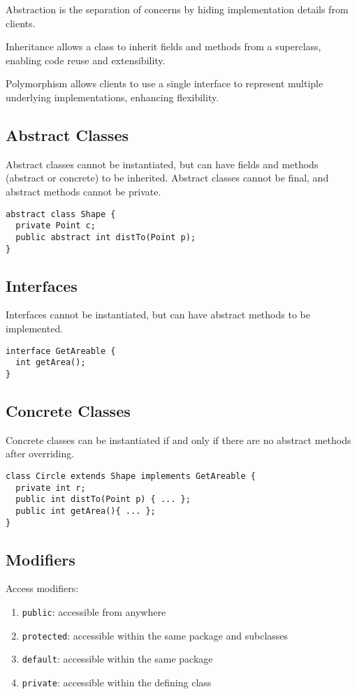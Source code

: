 \documentclass[12pt, a4paper]{article}
\begin{document}
\begin{multicols*}{3}
Abstraction is the separation of concerns by hiding implementation details from clients.

Inheritance allows a class to inherit fields and methods from a superclass, enabling code reuse and extensibility.

Polymorphism allows clients to use a single interface to represent multiple underlying implementations, enhancing flexibility.

\subsection{Abstract Classes}
Abstract classes cannot be instantiated, but can have fields and methods (abstract or concrete) to be inherited. Abstract classes cannot be final, and abstract methods cannot be private.
\begin{lstlisting}
abstract class Shape {
  private Point c;
  public abstract int distTo(Point p);
}
\end{lstlisting}

\subsection{Interfaces}
Interfaces cannot be instantiated, but can have abstract methods to be implemented.
\begin{lstlisting}
interface GetAreable {
  int getArea();
}
\end{lstlisting}

\subsection{Concrete Classes}
Concrete classes can be instantiated if and only if there are no abstract methods after overriding.
\begin{lstlisting}
class Circle extends Shape implements GetAreable {
  private int r;
  public int distTo(Point p) { ... };
  public int getArea(){ ... };
}
\end{lstlisting}

\subsection{Modifiers}
Access modifiers:
\begin{enumerate}[\roman*.]
  \item \lstinline|public|: accessible from anywhere
  \item \lstinline|protected|: accessible within the same package and subclasses
  \item \lstinline|default|: accessible within the same package
  \item \lstinline|private|: accessible within the defining class
\end{enumerate}


\end{multicols*}
\end{document}
